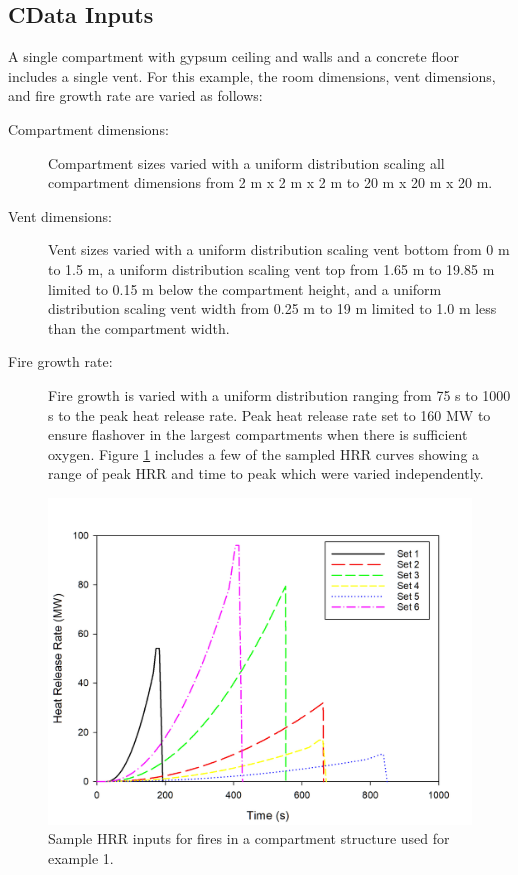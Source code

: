 \documentclass[12pt,twoside]{book}
\begin{document}
\subsection{CData Inputs}
A single compartment with gypsum ceiling and walls and a concrete floor includes a single vent. For this example, the room dimensions, vent dimensions, and fire growth rate are varied as follows:

\begin{description}
\item[Compartment dimensions:] Compartment sizes varied with a uniform distribution scaling all compartment dimensions from 2 m x 2 m x 2 m to 20 m x 20 m x 20 m.
\item[Vent dimensions:] Vent sizes varied with a uniform distribution scaling vent bottom from 0 m to 1.5 m, a uniform distribution scaling vent top from 1.65 m to 19.85 m limited to 0.15 m below the compartment height, and a uniform distribution scaling vent width from 0.25 m to 19 m limited to 1.0 m less than the compartment width.
\item[Fire growth rate:] Fire growth is varied with a uniform distribution ranging from 75 s to 1000 s to the peak heat release rate. Peak heat release rate set to 160 MW to ensure flashover in the largest compartments when there is sufficient oxygen. Figure \ref{flashover_fires} includes a few of the sampled HRR curves showing a range of peak HRR and time to peak which were varied independently.
\end{description}

\begin{figure}[h!]
\centering
\includegraphics[width=4.5in]{FIGURES/Flashover_HRR_Samples.jpg}
\caption{Sample HRR inputs for fires in a compartment structure used for example 1.}
\label{flashover_fires}
\end{figure}
\end{document}
